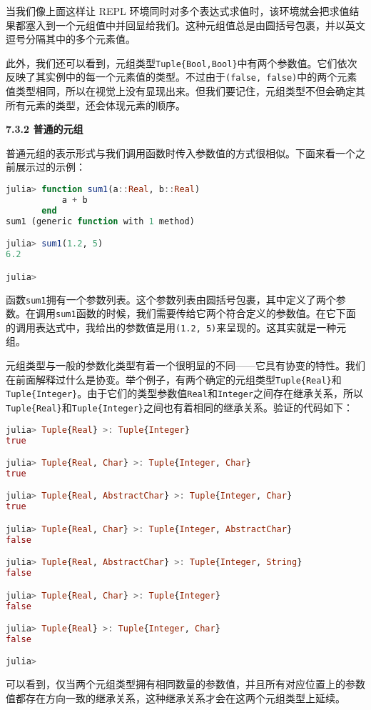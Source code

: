 当我们像上面这样让 REPL 环境同时对多个表达式求值时，该环境就会把求值结果都塞入到一个元组值中并回显给我们。这种元组值总是由圆括号包裹，并以英文逗号分隔其中的多个元素值。

此外，我们还可以看到，元组类型\verb|Tuple{Bool,Bool}|中有两个参数值。它们依次反映了其实例中的每一个元素值的类型。不过由于\verb|(false, false)|中的两个元素值类型相同，所以在视觉上没有显现出来。但我们要记住，元组类型不但会确定其所有元素的类型，还会体现元素的顺序。

\textbf{7.3.2 普通的元组}

普通元组的表示形式与我们调用函数时传入参数值的方式很相似。下面来看一个之前展示过的示例：
\begin{lstlisting}[language=julia]
julia> function sum1(a::Real, b::Real)
           a + b
       end
sum1 (generic function with 1 method)

julia> sum1(1.2, 5)
6.2

julia> 
\end{lstlisting}

函数\verb|sum1|拥有一个参数列表。这个参数列表由圆括号包裹，其中定义了两个参数。在调用\verb|sum1|函数的时候，我们需要传给它两个符合定义的参数值。在它下面的调用表达式中，我给出的参数值是用\verb|(1.2, 5)|来呈现的。这其实就是一种元组。

元组类型与一般的参数化类型有着一个很明显的不同——它具有协变的特性。我们在前面解释过什么是协变。举个例子，有两个确定的元组类型\verb|Tuple{Real}|和\verb|Tuple{Integer}|。由于它们的类型参数值\verb|Real|和\verb|Integer|之间存在继承关系，所以\verb|Tuple{Real}|和\verb|Tuple{Integer}|之间也有着相同的继承关系。验证的代码如下：
\begin{lstlisting}[language=julia]
julia> Tuple{Real} >: Tuple{Integer}
true

julia> Tuple{Real, Char} >: Tuple{Integer, Char}
true

julia> Tuple{Real, AbstractChar} >: Tuple{Integer, Char}
true

julia> Tuple{Real, Char} >: Tuple{Integer, AbstractChar}
false

julia> Tuple{Real, AbstractChar} >: Tuple{Integer, String}
false

julia> Tuple{Real, Char} >: Tuple{Integer}
false

julia> Tuple{Real} >: Tuple{Integer, Char}
false

julia> 
\end{lstlisting}

可以看到，仅当两个元组类型拥有相同数量的参数值，并且所有对应位置上的参数值都存在方向一致的继承关系，这种继承关系才会在这两个元组类型上延续。

